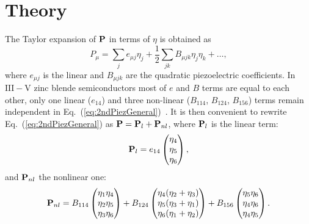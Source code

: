 
\newpage 





\section{Theory}

The Taylor expansion of ${\bf P}$ in terms of $\eta$ is obtained as
%
\begin{equation}
\label{eq:2ndPiezGeneral}
P_{\mu}=\sum_je_{\mu j}\eta_j+\frac{1}{2}\sum_{jk}B_{\mu jk}\eta_j\eta_k+\dots,
\end{equation}
%
where $e_{\mu j}$ is the linear and $B_{\mu jk}$ are the quadratic piezoelectric coefficients. In $\mathrm{III-V}$ zinc blende semiconductors most of $e$ and $B$ terms are equal to each other, only one linear ($e_{14}$) and three non-linear ($B_{114}$, $B_{124}$, $B_{156}$) terms remain independent in Eq.~(\ref{eq:2ndPiezGeneral})~\cite{Beya-Wakata2011}. It is then convenient to rewrite Eq.~(\ref{eq:2ndPiezGeneral}) as ${\bf P}={\bf P}_{l}+{\bf P}_{nl}$, where ${\bf P}_{l}$ is the linear term:
%
%
\begin{equation}
\label{eq:1stPiez}
{\bf P}_{l}=e_{14}\begin{pmatrix}\eta_4\\\eta_5\\\eta_6\end{pmatrix},
\end{equation}
%
and ${\bf P}_{nl}$ the nonlinear one:
%
\begin{equation}
\label{eq:2ndPiez}
{\bf P}_{nl}=B_{114}\begin{pmatrix}\eta_1\eta_4\\\eta_2\eta_5\\\eta_3\eta_6\end{pmatrix}+
B_{124}\begin{pmatrix}\eta_4(\eta_2+\eta_3)\\\eta_5(\eta_3+\eta_1)\\\eta_6(\eta_1+\eta_2)\end{pmatrix}+
B_{156}\begin{pmatrix}\eta_5\eta_6\\\eta_4\eta_6\\\eta_4\eta_5\end{pmatrix}.
\end{equation}
